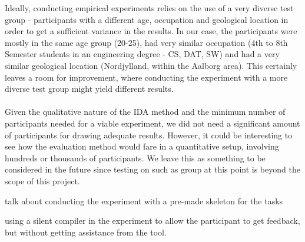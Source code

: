 Ideally, conducting empirical experiments relies on the use of a very diverse test group - participants with a different age, occupation and geological location in order to get a sufficient variance in the results. In our case, the participants were mostly in the same age group (20-25), had very similar occupation (4th to 8th Semester students in an engineering degree - CS, DAT, SW) and had a very similar geological location (Nordjylland, within the Aalborg area). This certainly leaves a room for improvement, where conducting the experiment with a more diverse test group might yield different results. \\\\
Given the qualitative nature of the IDA method and the minimum number of participants needed for a viable experiment, we did not need a significant amount of participants for drawing adequate results. However, it could be interesting to see how the evaluation method would fare in a quantitative setup, involving hundreds or thousands of participants. We leave this as something to be considered in the future since testing on such as group at this point is beyond the scope of this project.


talk about conducting the experiment with a pre-made skeleton for the tasks

using a silent compiler in the experiment to allow the participant to get feedback, but without getting assistance from the tool.